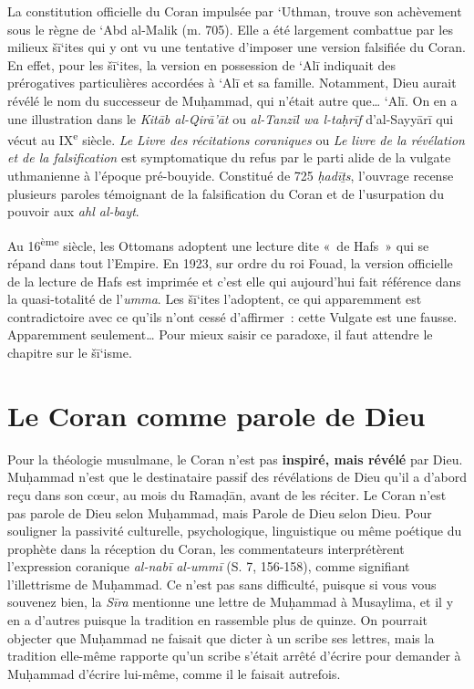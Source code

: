 La constitution officielle du Coran impulsée par `Uthman, trouve son
achèvement sous le règne de `Abd al-Malik (m. 705). Elle a été largement
combattue par les milieux šī`ites qui y ont vu une tentative d'imposer
une version falsifiée du Coran. En effet, pour les šī`ites, la version
en possession de `Alī indiquait des prérogatives particulières accordées
à `Alī et sa famille. Notamment, Dieu aurait révélé le nom du successeur
de Muḥammad, qui n'était autre que\ldots{} `Alī. On en a une
illustration dans le \emph{Kitāb al-Qirā'āt} ou \emph{al-Tanzīl wa
l-taḥrīf} d'al-Sayyārī qui vécut au IX\textsuperscript{e} siècle.
\emph{Le} \emph{Livre des récitations} \emph{coraniques} ou \emph{Le
livre de la révélation et de la falsification} est symptomatique du
refus par le parti alide de la vulgate uthmanienne à l'époque
pré-bouyide. Constitué de 725 \emph{ḥadīṯs}, l'ouvrage recense plusieurs
paroles témoignant de la falsification du Coran et de l'usurpation du
pouvoir aux \emph{ahl al-bayt}.

Au 16\textsuperscript{ème} siècle, les Ottomans adoptent une lecture
dite «~de Hafs~» qui se répand dans tout l'Empire. En 1923, sur ordre du
roi Fouad, la version officielle de la lecture de Hafs est imprimée et
c'est elle qui aujourd'hui fait référence dans la quasi-totalité de
l'\emph{umma}. Les šī`ites l'adoptent, ce qui apparemment est
contradictoire avec ce qu'ils n'ont cessé d'affirmer~: cette Vulgate est
une fausse. Apparemment seulement\ldots{} Pour mieux saisir ce paradoxe,
il faut attendre le chapitre sur le šī`isme.

 
\section{ Le Coran comme parole de Dieu
} 

Pour la théologie musulmane, le Coran n'est pas \textbf{inspiré, mais
révélé} par Dieu. Muḥammad n'est que le destinataire passif des
révélations de Dieu qu'il a d'abord reçu dans son cœur, au mois du
Ramaḍān, avant de les réciter. Le Coran n'est pas parole de Dieu selon
Muḥammad, mais Parole de Dieu selon Dieu. Pour souligner la passivité
culturelle, psychologique, linguistique ou même poétique du prophète
dans la réception du Coran, les commentateurs interprétèrent
l'expression coranique \emph{al-nabī al-ummī} (S. 7, 156-158), comme
signifiant l'illettrisme de Muḥammad. Ce n'est pas sans difficulté,
puisque si vous vous souvenez bien, la \emph{Sīra} mentionne une lettre
de Muḥammad à Musaylima, et il y en a d'autres puisque la tradition en
rassemble plus de quinze. On pourrait objecter que Muḥammad ne faisait
que dicter à un scribe ses lettres, mais la tradition elle-même rapporte
qu'un scribe s'était arrêté d'écrire pour demander à Muḥammad d'écrire
lui-même, comme il le faisait autrefois.

